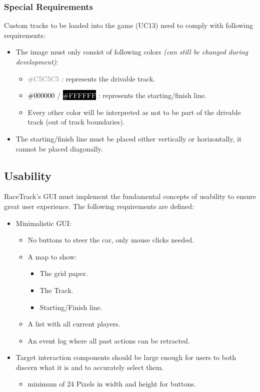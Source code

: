         \subsubsection{Special Requirements}
            Custom tracks to be loaded into the game (UC13) need to comply with following requirements:
            \begin{itemize}
                \item The image must only consist of following colors \textit{(can still be changed during development)}:
                \begin{itemize}
                    \item \textcolor{gray}{\#C5C5C5} : represents the drivable track.
                    \item \textcolor{black}{\#000000} / \colorbox{black}{\textcolor{white}{\#FFFFFF}} : represents the starting/finish line.
                    \item Every other color will be interpreted as not to be part of the drivable track (out of track boundaries).
                \end{itemize}
                \item The starting/finish line must be placed either vertically or horizontally, it cannot be placed diagonally.
            \end{itemize}

    \subsection{Usability}
        RaceTrack's GUI must implement the fundamental concepts of usability to ensure great user experience. The following requirements are defined:
        \begin{itemize}
            \item Minimalistic GUI:
            \begin{itemize}
                \item No buttons to steer the car, only mouse clicks needed.
                \item A map to show:
                \begin{itemize}
                    \item The grid paper.
                    \item The Track.
                    \item Starting/Finish line.
                \end{itemize}
                \item A list with all current players.
                \item An event log where all past actions can be retracted.
            \end{itemize}
            \item Target interaction components should be large enough for users to both discern what it is and to accurately select them.
            \begin{itemize}
                \item minimum of 24 Pixels in width and height for buttons.
            \end{itemize}
        \end{itemize}

